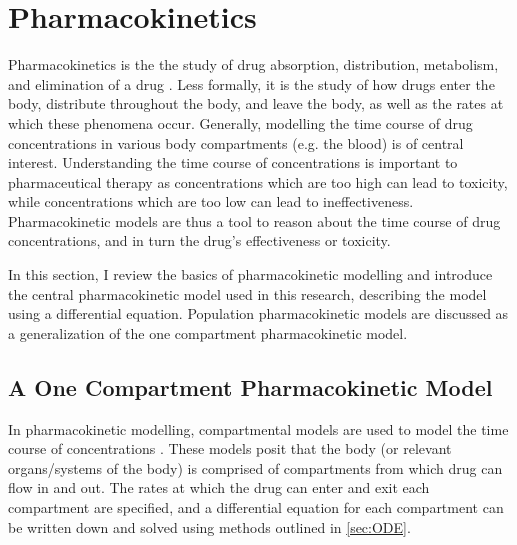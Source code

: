 \section{Pharmacokinetics} \label{PKPD}

Pharmacokinetics is the the study of drug absorption, distribution, metabolism, and elimination of a drug \cite{rosenbaum2016basic}.  Less formally,  it is the study of how drugs enter the body, distribute throughout the body, and leave the body, as well as the rates at which these phenomena occur.  Generally, modelling the time course of drug concentrations in various body compartments (e.g. the blood) is of central interest.  Understanding the time course of concentrations is important to pharmaceutical therapy as concentrations which are too high can lead to toxicity, while concentrations which are too low can lead to ineffectiveness.  Pharmacokinetic models are thus a tool to reason about the time course of drug concentrations, and in turn the drug's effectiveness or toxicity.

In this section, I review the basics of pharmacokinetic modelling and introduce the central pharmacokinetic model used in this research, describing the model using a differential equation.  Population pharmacokinetic models are discussed as a generalization of the one compartment pharmacokinetic model.


\subsection{A One Compartment Pharmacokinetic Model} 

In pharmacokinetic modelling, compartmental models are used to model the time course of concentrations \cite{rosenbaum2016basic}. These models posit that the body (or relevant organs/systems of the body) is comprised of compartments from which drug can flow in and out. The rates at which the drug can enter and exit each compartment are specified, and a differential equation for each compartment can be written down and solved using methods outlined in \cref{sec:ODE}.

